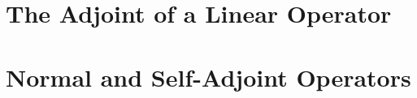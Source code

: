 \section{The Adjoint of a Linear Operator}



\vspace{12pt}



\vspace{12pt}

\setcounter{Exercise}{6}


\vspace{12pt}



\vspace{12pt}

\setcounter{Exercise}{11}



\section{Normal and Self-Adjoint Operators}



\vspace{12pt}



\vspace{12pt}



\vspace{12pt}

\setcounter{Exercise}{5}


\vspace{12pt}

\setcounter{Exercise}{8}






